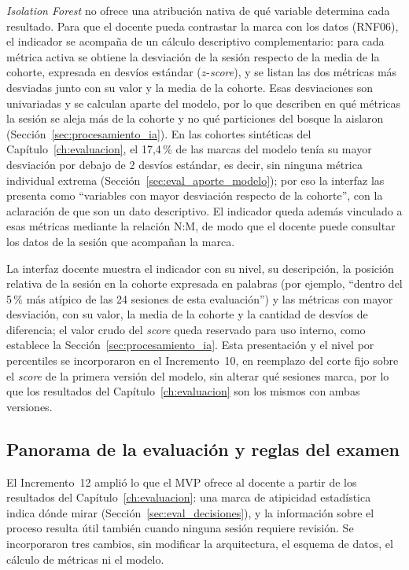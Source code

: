 \textit{Isolation Forest} no ofrece una atribución nativa de qué variable determina cada resultado. Para que el docente pueda contrastar la marca con los datos (RNF06), el indicador se acompaña de un cálculo descriptivo complementario: para cada métrica activa se obtiene la desviación de la sesión respecto de la media de la cohorte, expresada en desvíos estándar ($z$-\textit{score}), y se listan las dos métricas más desviadas junto con su valor y la media de la cohorte. Esas desviaciones son univariadas y se calculan aparte del modelo, por lo que describen en qué métricas la sesión se aleja más de la cohorte y no qué particiones del bosque la aislaron (Sección~\ref{sec:procesamiento_ia}). En las cohortes sintéticas del Capítulo~\ref{ch:evaluacion}, el 17,4\,\% de las marcas del modelo tenía su mayor desviación por debajo de 2 desvíos estándar, es decir, sin ninguna métrica individual extrema (Sección~\ref{sec:eval_aporte_modelo}); por eso la interfaz las presenta como ``variables con mayor desviación respecto de la cohorte'', con la aclaración de que son un dato descriptivo. El indicador queda además vinculado a esas métricas mediante la relación N:M, de modo que el docente puede consultar los datos de la sesión que acompañan la marca.

La interfaz docente muestra el indicador con su nivel, su descripción, la posición relativa de la sesión en la cohorte expresada en palabras (por ejemplo, ``dentro del 5\,\% más atípico de las 24 sesiones de esta evaluación'') y las métricas con mayor desviación, con su valor, la media de la cohorte y la cantidad de desvíos de diferencia; el valor crudo del \textit{score} queda reservado para uso interno, como establece la Sección~\ref{sec:procesamiento_ia}. Esta presentación y el nivel por percentiles se incorporaron en el Incremento~10, en reemplazo del corte fijo sobre el \textit{score} de la primera versión del modelo, sin alterar qué sesiones marca, por lo que los resultados del Capítulo~\ref{ch:evaluacion} son los mismos con ambas versiones.

\subsection{Panorama de la evaluación y reglas del examen}
\label{sec:impl_panorama}

El Incremento~12 amplió lo que el MVP ofrece al docente a partir de los resultados del Capítulo~\ref{ch:evaluacion}: una marca de atipicidad estadística indica dónde mirar (Sección~\ref{sec:eval_decisiones}), y la información sobre el proceso resulta útil también cuando ninguna sesión requiere revisión. Se incorporaron tres cambios, sin modificar la arquitectura, el esquema de datos, el cálculo de métricas ni el modelo.

